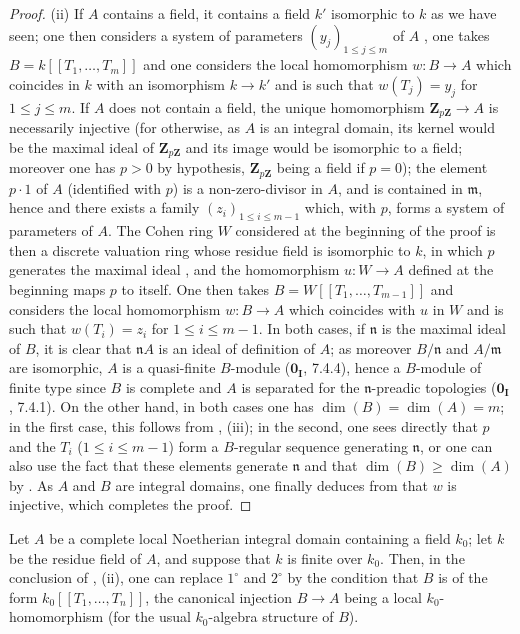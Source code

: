 \begin{proof}
\medskip
\noindent(ii)\enspace
If $A$ contains a field, it contains a field $k'$ isomorphic to $k$ as we have seen; one then considers a system of parameters $(y_j)_{1\leq j\leq m}$ of $A$ , one takes $B=k[[T_1,\ldots,T_m]]$ and one considers the local homomorphism $w:B\to A$ which coincides in $k$ with an isomorphism $k\to k'$ and is such that $w(T_j)=y_j$ for $1\leq j\leq m$.
If $A$ does not contain a field, the unique homomorphism $\mathbf{Z}_{p\mathbf{Z}}\to A$  is necessarily injective (for otherwise, as $A$ is an integral domain, its kernel would be the maximal ideal of $\mathbf{Z}_{p\mathbf{Z}}$ and its image would be isomorphic to a field; moreover one has $p>0$ by hypothesis, $\mathbf{Z}_{p\mathbf{Z}}$ being a field if $p=0$); the element $p\cdot 1$ of $A$ (identified with $p$) is a non-zero-divisor in $A$, and is contained in $\mathfrak{m}$, hence  and  there exists a family $(z_i)_{1\leq i\leq m-1}$ which, with $p$, forms a system of parameters of $A$.
The Cohen ring $W$ considered at the beginning of the proof is then a discrete valuation ring whose residue field is isomorphic to $k$, in which $p$ generates the maximal ideal , and the homomorphism $u:W\to A$ defined at the beginning maps $p$ to itself.
One then takes $B=W[[T_1,\ldots,T_{m-1}]]$ and considers the local homomorphism $w:B\to A$ which coincides with $u$ in $W$ and is such that $w(T_i)=z_i$ for $1\leq i\leq m-1$.
In both cases, if $\mathfrak{n}$ is the maximal ideal of $B$, it is clear that $\mathfrak{n}A$ is an ideal of definition of $A$; as moreover $B/\mathfrak{n}$ and $A/\mathfrak{m}$ are isomorphic, $A$ is a quasi-finite $B$-module ($\mathbf{0_I}$, 7.4.4), hence a $B$-module of finite type since $B$ is complete and $A$ is separated for the $\mathfrak{n}$-preadic topologies ($\mathbf{0_I}$, 7.4.1).
On the other hand, in both cases one has $\dim(B)=\dim(A)=m$; in the first case, this follows from , (iii); in the second, one sees directly that $p$ and the $T_i$ ($1\leq i\leq m-1$) form a $B$-regular sequence generating $\mathfrak{n}$, or one can also use the fact that these elements generate $\mathfrak{n}$ and that $\dim(B)\geq\dim(A)$ by .
As $A$ and $B$ are integral domains, one finally deduces from  that $w$ is injective, which completes the proof.
\end{proof}

\begin{corollary}[19.8.9]
\label{0.19.8.9}
Let $A$ be a complete local Noetherian integral domain containing a field $k_0$; let $k$ be the residue field of $A$, and suppose that $k$ is finite over $k_0$.
Then, in the conclusion of , (ii), one can replace $1^\circ$ and $2^\circ$ by the condition that $B$ is of the form $k_0[[T_1,\ldots,T_n]]$, the canonical injection $B\to A$ being a local $k_0$-homomorphism (for the usual $k_0$-algebra structure of $B$).
\end{corollary}

